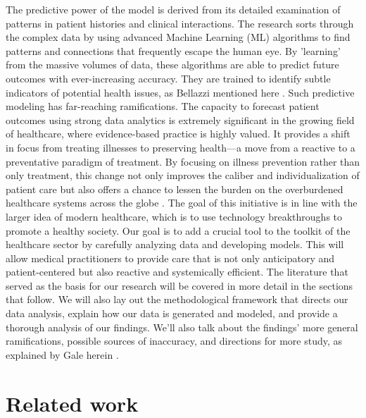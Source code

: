 \documentclass[manuscript,screen,]{acmart}
\begin{document}
The predictive power of the model is derived from its detailed examination of patterns in patient histories and clinical interactions. The research sorts through the complex data by using advanced Machine Learning (ML) algorithms to find patterns and connections that frequently escape the human eye. By 'learning' from the massive volumes of data, these algorithms are able to predict future outcomes with ever-increasing accuracy. They are trained to identify subtle indicators of potential health issues, as Bellazzi mentioned here \cite{bellazzi2008predictive}.
Such predictive modeling has far-reaching ramifications. The capacity to forecast patient outcomes using strong data analytics is extremely significant in the growing field of healthcare, where evidence-based practice is highly valued. It provides a shift in focus from treating illnesses to preserving health—a move from a reactive to a preventative paradigm of treatment. By focusing on illness prevention rather than only treatment, this change not only improves the caliber and individualization of patient care but also offers a chance to lessen the burden on the overburdened healthcare systems across the globe \cite{Woolf2009}.
The goal of this initiative is in line with the larger idea of modern healthcare, which is to use technology breakthroughs to promote a healthy society. Our goal is to add a crucial tool to the toolkit of the healthcare sector by carefully analyzing data and developing models. This will allow medical practitioners to provide care that is not only anticipatory and patient-centered but also reactive and systemically efficient.
The literature that served as the basis for our research will be covered in more detail in the sections that follow. We will also lay out the methodological framework that directs our data analysis, explain how our data is generated and modeled, and provide a thorough analysis of our findings. We'll also talk about the findings' more general ramifications, possible sources of inaccuracy, and directions for more study, as explained by Gale herein \cite{Gale2013FrameworkMethod}.

\section{Related work}
\end{document}

